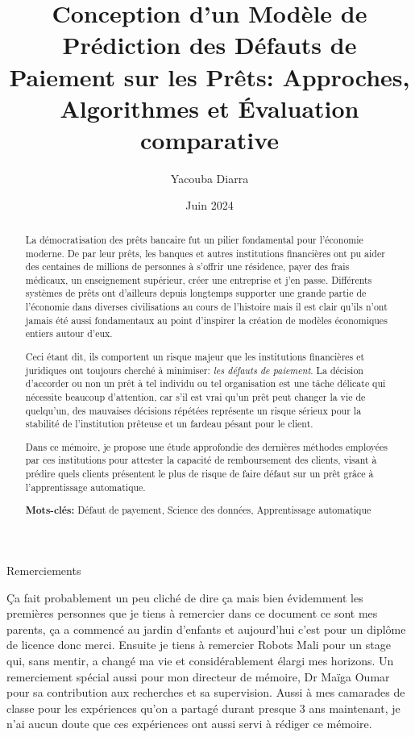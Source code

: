 \documentclass[a4paper,12pt,twoside]{report}
\title{Conception d'un Modèle de Prédiction des Défauts de Paiement sur les Prêts: Approches, Algorithmes et Évaluation comparative}
\author{Yacouba Diarra}
\date{Juin 2024}
\begin{document}
\pagestyle{empty}

\maketitle
\vspace{1cm}

\begin{abstract}
La démocratisation des prêts bancaire fut un pilier fondamental pour l'économie moderne. De par leur prêts, les banques et autres institutions financières ont pu aider des centaines de millions de personnes à s'offrir une résidence, payer des frais médicaux, un enseignement supérieur, créer une entreprise et j'en passe. Différents systèmes de prêts ont d'ailleurs depuis longtemps supporter une grande partie de l'économie dans diverses civilisations au cours de l'histoire mais il est clair qu'ils n'ont jamais été aussi fondamentaux au point d'inspirer la création de modèles économiques entiers autour d'eux.

Ceci étant dit, ils comportent un risque majeur que les institutions financières et juridiques ont toujours cherché à minimiser: \textit{les défauts de paiement}. La décision d'accorder ou non un prêt à tel individu ou tel organisation est une tâche délicate qui nécessite beaucoup d'attention, car s'il est vrai qu'un prêt peut changer la vie de quelqu'un, des mauvaises décisions répétées représente un risque sérieux pour la stabilité de l'institution prêteuse et un fardeau pésant pour le client.

Dans ce mémoire, je propose une étude approfondie des dernières méthodes employées par ces institutions pour attester la capacité de remboursement des clients, visant à prédire quels clients présentent le plus de risque de faire défaut sur un prêt grâce à l'apprentissage automatique.

\vspace{5mm}

\noindent\textbf{Mots-clés:} Défaut de payement, Science des données, Apprentissage automatique

\end{abstract}

\clearpage

\vfil

\centerline{\Large Remerciements}

\bigskip

\noindent
Ça fait probablement un peu cliché de dire ça mais bien évidemment les premières personnes que je tiens à remercier dans ce document ce sont mes parents, ça a commencé au jardin d'enfants et aujourd'hui c'est pour un diplôme de licence donc merci. Ensuite je tiens à remercier Robots Mali pour un stage qui, sans mentir, a changé ma vie et considérablement élargi mes horizons. Un remerciement spécial aussi pour mon directeur de mémoire, Dr Maïga Oumar pour sa contribution aux recherches et sa supervision. Aussi à mes camarades de classe pour les expériences qu'on a partagé durant presque 3 ans maintenant, je n'ai aucun doute que ces expériences ont aussi servi à rédiger ce mémoire. 
\end{document}
